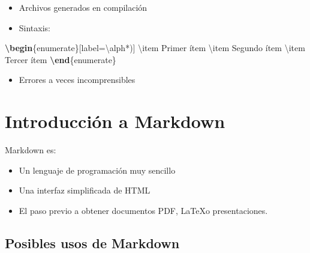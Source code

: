 \documentclass[
  spanish,
]{article}
\newenvironment{Shaded}{}{}
\newcommand{\ExtensionTok}[1]{#1}
\newcommand{\FunctionTok}[1]{\textcolor[rgb]{0.02,0.16,0.49}{#1}}
\newcommand{\KeywordTok}[1]{\textcolor[rgb]{0.00,0.44,0.13}{\textbf{#1}}}
\newcommand{\NormalTok}[1]{#1}
\providecommand{\tightlist}{%
  \setlength{\itemsep}{0pt}\setlength{\parskip}{0pt}}
\begin{document}
\begin{itemize}
\tightlist
\item
  Archivos generados en compilación
\item
  Sintaxis:
\end{itemize}

\begin{Shaded}
\begin{Highlighting}[]
\KeywordTok{\textbackslash{}begin}\NormalTok{\{}\ExtensionTok{enumerate}\NormalTok{\}[label=}\FunctionTok{\textbackslash{}alph*}\NormalTok{)]}
    \FunctionTok{\textbackslash{}item}\NormalTok{ Primer ítem}
    \FunctionTok{\textbackslash{}item}\NormalTok{ Segundo ítem}
    \FunctionTok{\textbackslash{}item}\NormalTok{ Tercer ítem}
\KeywordTok{\textbackslash{}end}\NormalTok{\{}\ExtensionTok{enumerate}\NormalTok{\}}
\end{Highlighting}
\end{Shaded}

\begin{itemize}
\tightlist
\item
  Errores a veces incomprensibles
\end{itemize}

\section{Introducción a Markdown}\label{introducciuxf3n-a-markdown}

Markdown es:

\begin{itemize}
\tightlist
\item
  Un lenguaje de programación muy sencillo
\item
  Una interfaz simplificada de HTML
\item
  El paso previo a obtener documentos PDF, \LaTeX o presentaciones.
\end{itemize}

\subsection{Posibles usos de Markdown}\label{posibles-usos-de-markdown}
\end{document}
